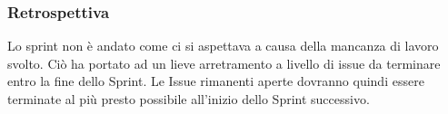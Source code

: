 \subsubsection{Retrospettiva}
Lo sprint non è andato come ci si aspettava a causa della mancanza di lavoro svolto.
Ciò ha portato ad un lieve arretramento a livello di issue da terminare entro la fine dello Sprint. 
Le Issue rimanenti aperte dovranno quindi essere terminate al più presto possibile all'inizio dello Sprint successivo.